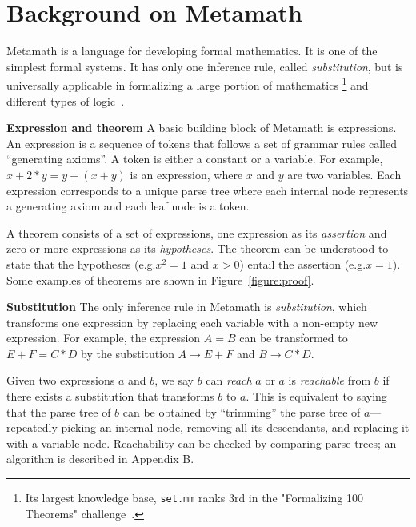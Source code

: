 \documentclass{article}
\begin{document}
\section{Background on Metamath}
\label{sec:metamath}

Metamath is a language for developing formal mathematics. 
It is one of the simplest formal systems. It has only one inference rule, called \emph{substitution},
but is universally applicable in formalizing a large portion of mathematics
\footnote{Its largest knowledge base, \texttt{set.mm} ranks 3rd 
in the "Formalizing 100 Theorems" challenge~\citep{formalize100}.}
and different types of logic~\citep{metamath}.


\noindent\textbf{Expression and theorem}
A basic building block of Metamath is expressions. An expression is 
a sequence of tokens that follows a set of grammar rules called ``generating axioms''. 
A token is either a constant or a variable.  For example, 
$x+2*y=y+(x+y)$ is an expression, where $x$ and $y$ are two variables.  Each expression corresponds to a unique parse tree where each internal node represents a generating axiom and each leaf node is a token.  

A theorem consists of a set of expressions, one expression as its \emph{assertion} and zero or more expressions as its \emph{hypotheses}. 
The theorem can be understood to state that the hypotheses (e.g.\@ $x^2=1$ and $x>0$) 
entail the assertion (e.g.\@ $x=1$).
Some examples of theorems are shown in Figure~\ref{figure:proof}.

\noindent\textbf{Substitution}
The only inference rule in Metamath is \emph{substitution}, which transforms one expression by replacing each variable with a non-empty new expression. For example, the expression $A=B$ can be transformed to $E+F=C*D$ by the substitution $A\rightarrow E+F$ and $B\rightarrow C*D$. 

Given two expressions $a$ and $b$, we say $b$ can \emph{reach} $a$ or $a$ is \emph{reachable} from $b$ if there exists a substitution that transforms $b$ to $a$. This is equivalent to saying that the parse tree of $b$ can be obtained by ``trimming'' the parse tree of $a$---repeatedly picking an internal node, removing all its descendants, and replacing it with a variable node. Reachability can be checked by comparing parse trees; an algorithm is described in Appendix B. 
\end{document}
